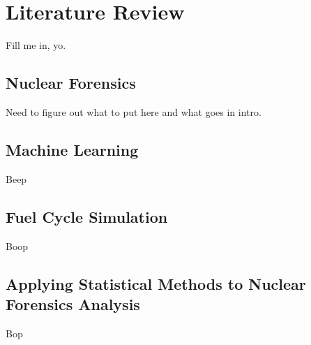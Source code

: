 \chapter{Literature Review}
\label{ch:litrev}

Fill me in, yo.

\section{Nuclear Forensics}
\label{sec:nfoverview}

Need to figure out what to put here and what goes in intro. 

\section{Machine Learning}


Beep

\section{Fuel Cycle Simulation}
\label{sec:fcsim}

Boop

\section{Applying Statistical Methods to Nuclear Forensics Analysis}
\label{sec:stats4nf}

Bop
